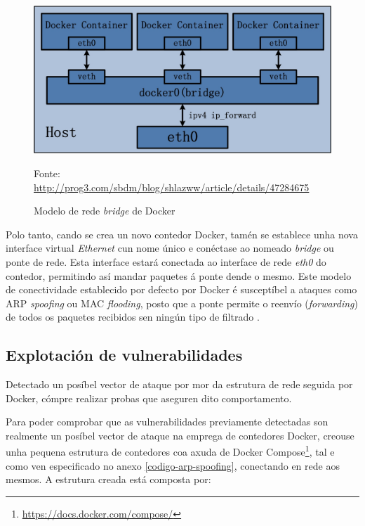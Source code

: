 \begin{figure}
\centerline{\includegraphics[width=15cm]{figuras/Docker_Topology.jpg}}
\caption{Modelo de rede \textit{bridge} de Docker}
\small
\centerline{Fonte: \url{http://prog3.com/sbdm/blog/shlazww/article/details/47284675}}
\label{DockerTopology}
\end{figure}

Polo tanto, cando se crea un novo contedor Docker, tamén se establece unha nova interface virtual \textit{Ethernet} cun nome único e conéctase ao nomeado \textit{bridge} ou ponte de rede. Esta interface estará conectada ao interface de rede \textit{eth0} do contedor, permitindo así mandar paquetes á ponte dende o mesmo. Este modelo de conectividade establecido por defecto por Docker é susceptíbel a ataques como \gls{ARP} \textit{spoofing} ou \gls{MAC} \textit{flooding}, posto que a ponte permite o reenvío (\textit{forwarding}) de todos os paquetes recibidos sen ningún tipo de filtrado \cite{Securing-Docker-Containers-from-Denial-of-Service}.\\

\subsection{Explotación de vulnerabilidades}

Detectado un posíbel vector de ataque por mor da estrutura de rede seguida por Docker, cómpre realizar probas que aseguren dito comportamento.

Para poder comprobar que as vulnerabilidades previamente detectadas son realmente un posíbel vector de ataque na emprega de contedores Docker, creouse unha pequena estrutura de contedores coa axuda de Docker Compose\footnote{\url{https://docs.docker.com/compose/}}, tal e como ven especificado no anexo \ref{codigo-arp-spoofing}, conectando en rede aos mesmos. A estrutura creada está composta por:


